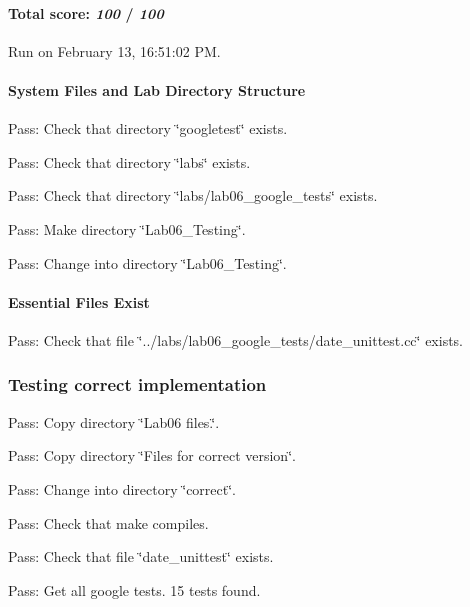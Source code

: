\paragraph*{Total score\+: {\itshape 100} / {\itshape 100}}

Run on February 13, 16\+:51\+:02 PM.

\paragraph*{System Files and Lab Directory Structure}


\begin{DoxyItemize}
\item Pass\+: Check that directory \char`\"{}googletest\char`\"{} exists.
\item Pass\+: Check that directory \char`\"{}labs\char`\"{} exists.
\item Pass\+: Check that directory \char`\"{}labs/lab06\+\_\+google\+\_\+tests\char`\"{} exists.
\item Pass\+: Make directory \char`\"{}\+Lab06\+\_\+\+Testing\char`\"{}.
\item Pass\+: Change into directory \char`\"{}\+Lab06\+\_\+\+Testing\char`\"{}.
\end{DoxyItemize}

\paragraph*{Essential Files Exist}


\begin{DoxyItemize}
\item Pass\+: Check that file \char`\"{}../labs/lab06\+\_\+google\+\_\+tests/date\+\_\+unittest.\+cc\char`\"{} exists.
\end{DoxyItemize}

\subsubsection*{Testing correct implementation}


\begin{DoxyItemize}
\item Pass\+: Copy directory \char`\"{}\+Lab06 files.\char`\"{}.
\item Pass\+: Copy directory \char`\"{}\+Files for correct version\char`\"{}.
\item Pass\+: Change into directory \char`\"{}correct\char`\"{}.
\item Pass\+: Check that make compiles.
\item Pass\+: Check that file \char`\"{}date\+\_\+unittest\char`\"{} exists.
\item Pass\+: Get all google tests. 15 tests found.
\end{DoxyItemize}

